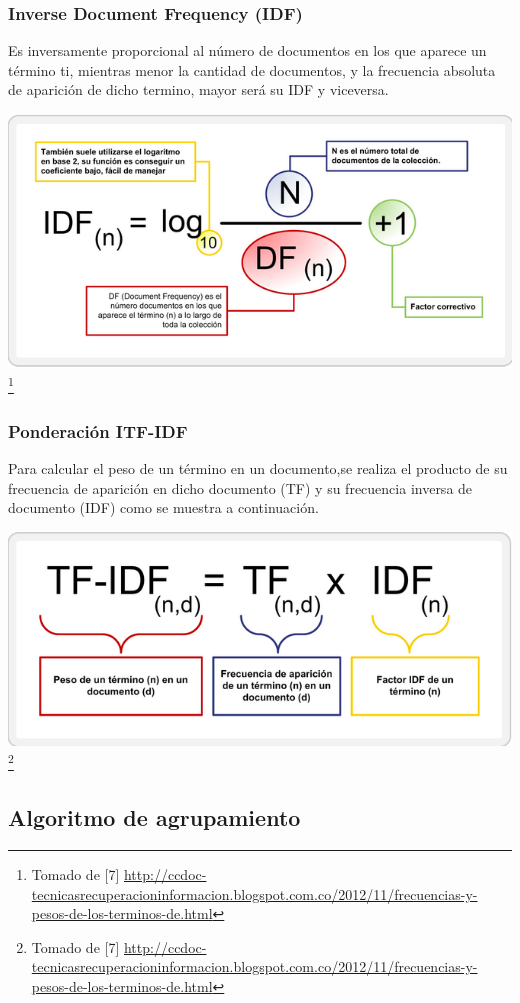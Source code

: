 \subsubsection{Inverse Document Frequency (IDF)}
Es inversamente proporcional al número de documentos en los que aparece un
término ti, mientras menor la cantidad de documentos, y la frecuencia absoluta de
aparición de dicho termino, mayor será su IDF y viceversa.

\includegraphics[scale=0.3]{idf_calculate}
\footnote{Tomado de [7]
\url{http://ccdoc-tecnicasrecuperacioninformacion.blogspot.com.co/2012/11/frecuencias-y-pesos-de-los-terminos-de.html}}


\subsubsection{Ponderación ITF-IDF}
Para calcular el peso de un término en un documento,se realiza el producto de su frecuencia de aparición en dicho documento (TF) y su frecuencia inversa de documento (IDF)
como se muestra a continuación.

\includegraphics[scale=0.3]{tf-idf}
\footnote{Tomado de [7]
\url{http://ccdoc-tecnicasrecuperacioninformacion.blogspot.com.co/2012/11/frecuencias-y-pesos-de-los-terminos-de.html}}

\subsection{Algoritmo de agrupamiento}
